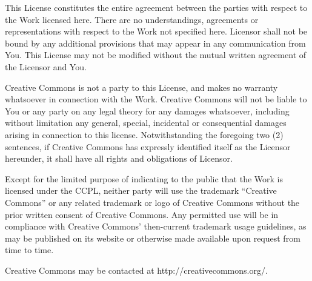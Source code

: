     This License constitutes the entire agreement between the parties with respect to the Work licensed here. There are no understandings, agreements or representations with respect to the Work not specified here. Licensor shall not be bound by any additional provisions that may appear in any communication from You. This License may not be modified without the mutual written agreement of the Licensor and You.

\bigskip

Creative Commons is not a party to this License, and makes no warranty whatsoever in connection with the Work. Creative Commons will not be liable to You or any party on any legal theory for any damages whatsoever, including without limitation any general, special, incidental or consequential damages arising in connection to this license. Notwithstanding the foregoing two (2) sentences, if Creative Commons has expressly identified itself as the Licensor hereunder, it shall have all rights and obligations of Licensor.

Except for the limited purpose of indicating to the public that the Work is licensed under the CCPL, neither party will use the trademark ``Creative Commons'' or any related trademark or logo of Creative Commons without the prior written consent of Creative Commons. Any permitted use will be in compliance with Creative Commons' then-current trademark usage guidelines, as may be published on its website or otherwise made available upon request from time to time.

Creative Commons may be contacted at http://creativecommons.org/.

